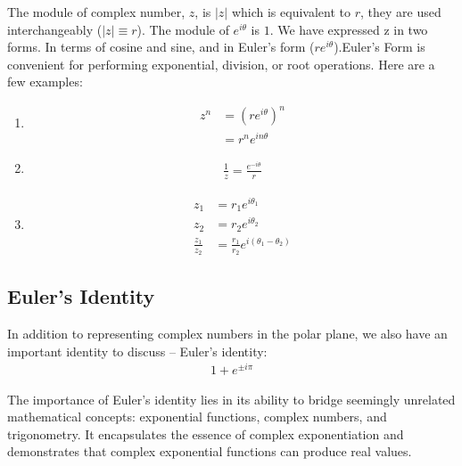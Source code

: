 \documentclass[12pt]{article}
\begin{document}
The module of complex number, $z$, is $|z|$ which is equivalent to $r$, they are used interchangeably ($|z| \equiv r$). The module of $e^{i \theta}$ is $1$. We have expressed z in two forms. In terms of cosine and sine, and in Euler's form ($ re^{i\theta}$).Euler's Form is convenient for performing exponential, division, or root operations. Here are a few examples:
\begin{enumerate}
	\item
\begin{equation}
    \begin{aligned}
	    z^n &= (re^{i\theta})^n\\
		&= r^n e^{in\theta}
    \end{aligned}
\end{equation}

\item
\begin{equation}
    \begin{aligned}
	    \frac{1}{z} = \frac{e^{-i\theta}}{r}
    \end{aligned}
\end{equation}

\item
\begin{equation}
    \begin{aligned}
	z_1 &= r_1 e^{i\theta_1}\\
	z_2 &= r_2 e^{i\theta_2}\\
	\frac{z_1}{z_2}&=\frac{r_1}{r_2} e^{i(\theta_1 - \theta_2)}
    \end{aligned}
\end{equation}
\end{enumerate}

\subsection{Euler's Identity}
In addition to representing complex numbers in the polar plane, we also have an important identity to discuss -- Euler's identity:
\begin{equation}
    \begin{aligned}
    1+e^{\pm i \pi}
    \end{aligned}
\end{equation}

The importance of Euler's identity lies in its ability to bridge seemingly unrelated mathematical concepts: exponential functions, complex numbers, and trigonometry. It encapsulates the essence of complex exponentiation and demonstrates that complex exponential functions can produce real values.
\end{document}
